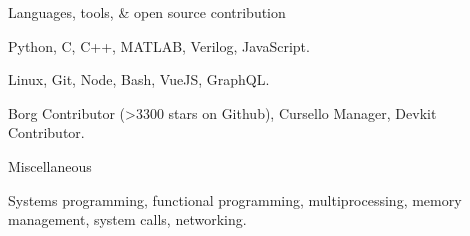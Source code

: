 \begin{cventries}
  \cventry
    {Languages, tools, \& open source contribution}
    {}
    {}
    {}
    {
      \begin{cvitems}
        \item {Python, C, C++, MATLAB, Verilog, JavaScript.}
        \item {Linux, Git, Node, Bash, VueJS, GraphQL.}
        \item {Borg Contributor (>3300 stars on Github), Cursello Manager, Devkit Contributor.}
      \end{cvitems}
    }
  \cventry
    {Miscellaneous}
    {}
    {}
    {}
    {
      \begin{cvitems}
        \item {Systems programming, functional programming, multiprocessing, memory management, system calls, networking.}
      \end{cvitems}
    }
\end{cventries}
